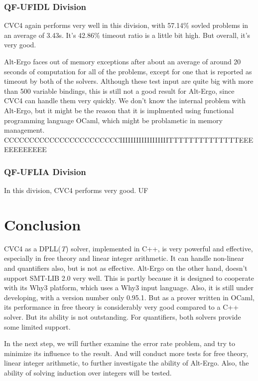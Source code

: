 \documentclass[10pt,letter]{article}
\theoremstyle{definition}
\begin{document}
\subsubsection{QF-UFIDL Division}

CVC4 again performs very well in this division, with 57.14\% sovled problems in an average of 3.43s. It's 42.86\% timeout ratio is a little bit high. But overall, it's very good.

Alt-Ergo faces out of memory exceptions after about an average of around 20 seconds of computation for all of the problems, except for one that is reported as timeout by both of the solvers. Although these test input are quite big with more than 500 variable bindings, this is still not a good result for Alt-Ergo, since CVC4 can handle them very quickly. We don't know the internal problem with Alt-Ergo, but it might be the reason that it is implmented using functional programming language OCaml, which might be problametic in memory management. CCCCCCCCCCCCCCCCCCCCCCCIIIIIIIIIIIIIIIIIITTTTTTTTTTTTTTEEEEEEEEEEEE

\subsubsection{QF-UFLIA Division}

In this division, CVC4 performs very good. UF

\section{Conclusion}

CVC4 as a DPLL({\it T}) solver, implemented in C++, is very powerful and effective, especially in free theory and linear integer arithmetic. It can handle non-linear and quantifiers also, but is not as effective. Alt-Ergo on the other hand, doesn't support SMT-LIB 2.0 very well. This is partly because it is designed to cooperate with its Why3 platform, which uses a Why3 input language. Also, it is still under developing, with a version number only 0.95.1. But as a prover written in OCaml, its performance in free theory is considerably very good compared to a C++ solver. But its ability is not outstanding. For quantifiers, both solvers provide some limited support.

In the next step, we will further examine the error rate problem, and try to minimize its influence to the result. And will conduct more tests for free theory, linear integer arithmetic, to further investigate the ability of Alt-Ergo. Also, the ability of solving induction over integers will be tested.
\end{document}
